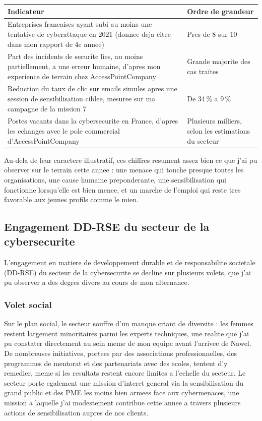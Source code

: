 \documentclass[11pt,a4paper]{article}
\begin{document}
\begin{center}
\small
\begin{tabular}{@{}p{9.0cm}p{4.4cm}@{}}
\toprule
\textbf{Indicateur} & \textbf{Ordre de grandeur} \\
\midrule
Entreprises francaises ayant subi au moins une tentative de cyberattaque en 2021 (donnee deja citee dans mon rapport de 4e annee) & Pres de 8 sur 10 \\
Part des incidents de securite lies, au moins partiellement, a une erreur humaine, d'apres mon experience de terrain chez AccessPointCompany & Grande majorite des cas traites \\
Reduction du taux de clic sur emails simules apres une session de sensibilisation ciblee, mesuree sur ma campagne de la mission 7 & De 34\,\% a 9\,\% \\
Postes vacants dans la cybersecurite en France, d'apres les echanges avec le pole commercial d'AccessPointCompany & Plusieurs milliers, selon les estimations du secteur \\
\bottomrule
\end{tabular}
\end{center}

Au-dela de leur caractere illustratif, ces chiffres resument assez bien ce que j'ai pu observer sur le terrain cette annee : une menace qui touche presque toutes les organisations, une cause humaine preponderante, une sensibilisation qui fonctionne lorsqu'elle est bien menee, et un marche de l'emploi qui reste tres favorable aux jeunes profils comme le mien.

\subsection{Engagement DD-RSE du secteur de la cybersecurite}

L'engagement en matiere de developpement durable et de responsabilite societale (DD-RSE) du secteur de la cybersecurite se decline sur plusieurs volets, que j'ai pu observer a des degres divers au cours de mon alternance.

\subsubsection*{Volet social}

Sur le plan social, le secteur souffre d'un manque criant de diversite : les femmes restent largement minoritaires parmi les experts techniques, une realite que j'ai pu constater directement au sein meme de mon equipe avant l'arrivee de Nawel. De nombreuses initiatives, portees par des associations professionnelles, des programmes de mentorat et des partenariats avec des ecoles, tentent d'y remedier, meme si les resultats restent encore limites a l'echelle du secteur. Le secteur porte egalement une mission d'interet general via la sensibilisation du grand public et des PME les moins bien armees face aux cybermenaces, une mission a laquelle j'ai modestement contribue cette annee a travers plusieurs actions de sensibilisation aupres de nos clients.
\end{document}
